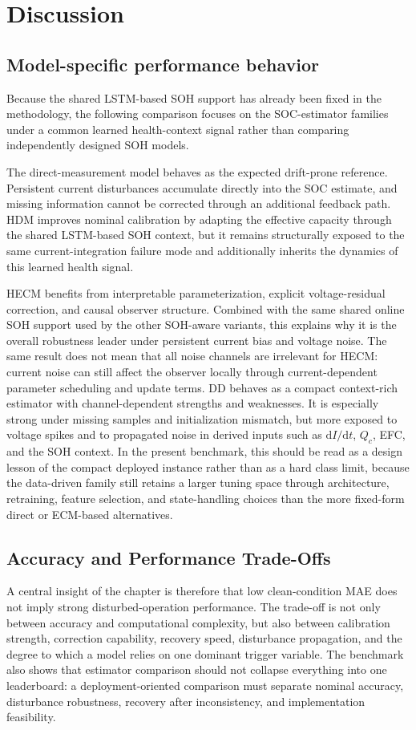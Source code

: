 \documentclass[
    a4paper,
    12pt,
    titlepage,
    bibliography=totoc,
    twoside=on,
    parskip=false,
    numbers=noenddot,
    cleardoublepage=empty,
    DIV=12,
    BCOR=12.0mm,
    headheight=36pt,
    headings=openright
]{scrreprt}
\begin{document}
\section{Discussion}
\subsection{Model-specific performance behavior}
Because the shared LSTM-based SOH support has already been fixed in the methodology, the following comparison focuses on the SOC-estimator families under a common learned health-context signal rather than comparing independently designed SOH models.

The direct-measurement model behaves as the expected drift-prone reference. Persistent current disturbances accumulate directly into the SOC estimate, and missing information cannot be corrected through an additional feedback path. HDM improves nominal calibration by adapting the effective capacity through the shared LSTM-based SOH context, but it remains structurally exposed to the same current-integration failure mode and additionally inherits the dynamics of this learned health signal.

HECM benefits from interpretable parameterization, explicit voltage-residual correction, and causal observer structure. Combined with the same shared online SOH support used by the other SOH-aware variants, this explains why it is the overall robustness leader under persistent current bias and voltage noise. The same result does not mean that all noise channels are irrelevant for HECM: current noise can still affect the observer locally through current-dependent parameter scheduling and update terms. DD behaves as a compact context-rich estimator with channel-dependent strengths and weaknesses. It is especially strong under missing samples and initialization mismatch, but more exposed to voltage spikes and to propagated noise in derived inputs such as $\mathrm{d}I/\mathrm{d}t$, $Q_c$, EFC, and the SOH context. In the present benchmark, this should be read as a design lesson of the compact deployed instance rather than as a hard class limit, because the data-driven family still retains a larger tuning space through architecture, retraining, feature selection, and state-handling choices than the more fixed-form direct or ECM-based alternatives.

\subsection{Accuracy and Performance Trade-Offs}
A central insight of the chapter is therefore that low clean-condition MAE does not imply strong disturbed-operation performance. The trade-off is not only between accuracy and computational complexity, but also between calibration strength, correction capability, recovery speed, disturbance propagation, and the degree to which a model relies on one dominant trigger variable. The benchmark also shows that estimator comparison should not collapse everything into one leaderboard: a deployment-oriented comparison must separate nominal accuracy, disturbance robustness, recovery after inconsistency, and implementation feasibility.
\end{document}
